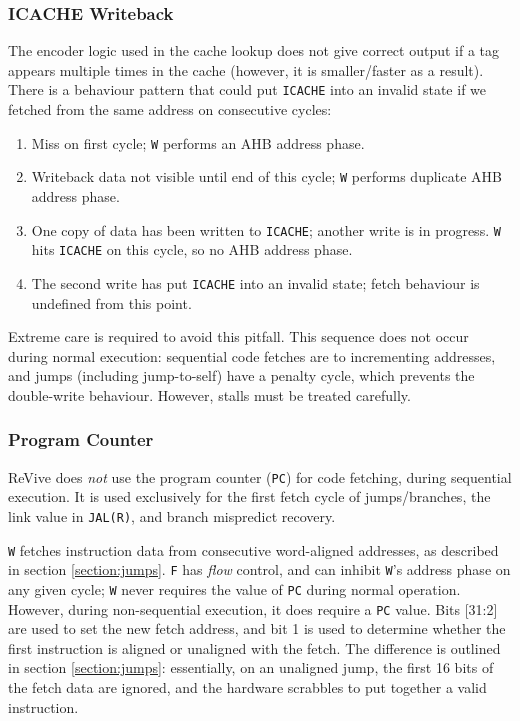 \documentclass{article}
\begin{document}
\subsubsection{ICACHE Writeback}

The encoder logic used in the cache lookup does not give correct output if a tag appears multiple times in the cache (however, it is smaller/faster as a result). There is a behaviour pattern that could put \texttt{ICACHE} into an invalid state if we fetched from the same address on consecutive cycles:

\begin{enumerate}
	\item Miss on first cycle; \texttt{W} performs an AHB address phase.
	\item Writeback data not visible until end of this cycle; \texttt{W} performs duplicate AHB address phase.
	\item One copy of data has been written to \texttt{ICACHE}; another write is in progress. \texttt{W} hits \texttt{ICACHE} on this cycle, so no AHB address phase.
	\item The second write has put \texttt{ICACHE} into an invalid state; fetch behaviour is undefined from this point.
\end{enumerate}

Extreme care is required to avoid this pitfall. This sequence does not occur during normal execution: sequential code fetches are to incrementing addresses, and jumps (including jump-to-self) have a penalty cycle, which prevents the double-write behaviour. However, stalls must be treated carefully.

\subsubsection{Program Counter}

ReVive does \textit{not} use the program counter (\texttt{PC}) for code fetching, during sequential execution. It is used exclusively for the first fetch cycle of jumps/branches, the link value in \texttt{JAL(R)}, and branch mispredict recovery.

\texttt{W} fetches instruction data from consecutive word-aligned addresses, as described in section \ref{section:jumps}. \texttt{F} has \textit{flow} control, and can inhibit \texttt{W}'s address phase on any given cycle; \texttt{W} never requires the value of \texttt{PC} during normal operation. However, during non-sequential execution, it does require a \texttt{PC} value. Bits [31:2] are used to set the new fetch address, and bit 1 is used to determine whether the first instruction is aligned or unaligned with the fetch. The difference is outlined in section \ref{section:jumps}: essentially, on an unaligned jump, the first 16 bits of the fetch data are ignored, and the hardware scrabbles to put together a valid instruction.
\end{document}
